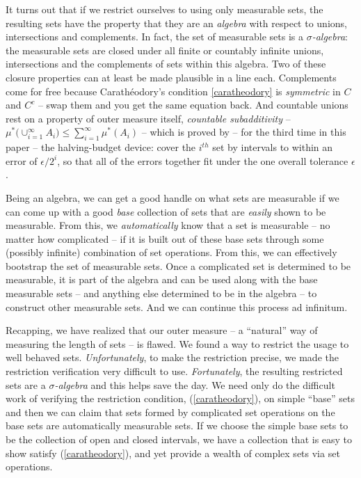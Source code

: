 \documentclass{article}
\begin{document}
It turns out that if we restrict ourselves to using only measurable sets, 
the resulting sets have the property that they are an 
{\em algebra\/} with respect to unions, intersections and complements. 
In fact, the set of measurable sets is a {\em $\sigma$-algebra\/}:
the measurable sets are closed under all finite or countably infinite unions,
intersections and the complements of sets within this algebra.
Two of these closure properties can at least be made plausible in a line
each. Complements come for free because Carath\'eodory's condition
\eqref{caratheodory} is {\em symmetric\/} in $C$ and $C^c$ -- swap them and
you get the same equation back. And countable unions rest on a property of
outer measure itself, {\em countable subadditivity\/} --
$\mu^*\bigl(\mathop{\cup}_{i=1}^\infty A_i\bigr) \le \sum_{i=1}^\infty \mu^*(A_i)$ --
which is proved by -- for the third time in this paper -- the halving-budget
device: cover the $i^{th}$ set by intervals to within an error of
$\epsilon / 2^{i}$, so that all of the errors together fit under the one
overall tolerance $\epsilon$.

Being an algebra, we can get a good handle on what sets are measurable if we 
can come up with a good {\em base\/} collection of sets that are {\em easily\/} shown
to be measurable. From this, we {\em automatically\/} know that a set is measurable 
-- no matter how complicated -- if it is built out of these base sets
through some (possibly infinite) combination of set operations.
From this, we can effectively bootstrap the set of measurable sets.
Once a complicated set is determined to be measurable, it is part of the 
algebra and can be used along with the base measurable sets -- and anything 
else determined to be in the algebra -- to construct other measurable sets. 
And we can continue this process ad infinitum.

Recapping, we have realized that our outer measure -- a ``natural'' way of 
measuring the length of sets -- is flawed. We found a way to restrict the 
usage to well behaved sets. {\em Unfortunately\/}, to make the restriction precise, 
we made the restriction verification very difficult to use. {\em Fortunately\/}, 
the resulting restricted sets are a {\em $\sigma$-algebra\/} and this helps 
save the day. We need only do the difficult work of verifying the restriction 
condition, (\ref{caratheodory}), on simple ``base'' sets and then we can claim that 
sets formed by complicated set operations on the base sets are automatically 
measurable sets. If we choose the simple base sets 
to be the collection of open and closed intervals, we have a collection that 
is easy to show satisfy (\ref{caratheodory}), and yet provide a wealth of complex sets
via set operations.
\end{document}
